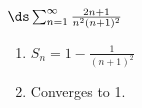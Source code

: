 {$\ds \sum_{n=1}^\infty \frac{2n+1}{n^2(n+1)^2}$
}
{\begin{enumerate}
\item	$S_n = 1-\frac{1}{(n+1)^2}$
\item	Converges to 1.
\end{enumerate}
}
